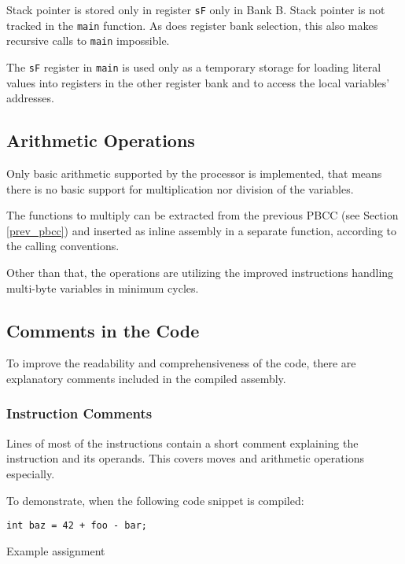         Stack pointer is stored only in register \texttt{sF} only in Bank B. Stack pointer is not tracked in the \texttt{main} function. As does register bank selection, this also makes recursive calls to \texttt{main} impossible.

        The \texttt{sF} register in \texttt{main} is used only as a temporary storage for loading literal values into registers in the other register bank and to access the local variables' addresses.

        \subsection{Arithmetic Operations}

        Only basic arithmetic supported by the processor is implemented, that means there is no basic support for multiplication nor division of the variables.

        The functions to multiply can be extracted from the previous PBCC (see Section \ref{prev_pbcc}) and inserted as inline assembly in a separate function, according to the calling conventions.

        Other than that, the operations are utilizing the improved instructions handling multi-byte variables in minimum cycles.

        \subsection{Comments in the Code}

        To improve the readability and comprehensiveness of the code, there are explanatory comments included in the compiled assembly.

            \subsubsection{Instruction Comments}

            Lines of most of the instructions contain a short comment explaining the instruction and its operands. This covers moves and arithmetic operations especially.

            To demonstrate, when the following code snippet is compiled:

            \begin{listing}
            \centering
            \texttt{int baz = 42 + foo - bar;}
            \caption{Example assignment}\label{lst:assign}
            \end{listing}

